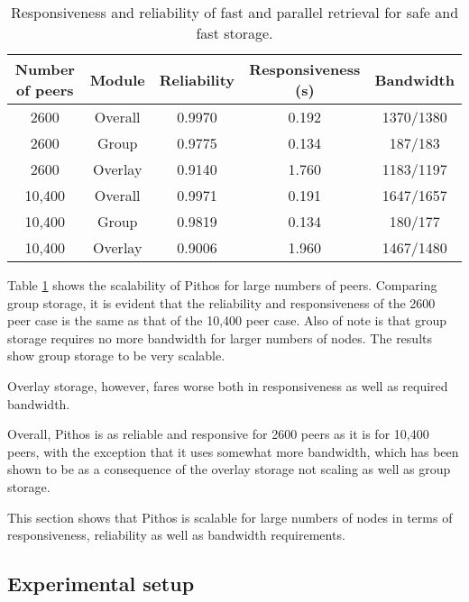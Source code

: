 \begin{table}[htbp]
\centering
\begin{tabular}{|c|c|c|c|c|}
\hline
Number of peers & Module & Reliability & Responsiveness (s)  & Bandwidth \\
\hline
2600            & Overall&  0.9970     &   0.192             & 1370/1380 \\
2600            & Group  &  0.9775     &   0.134             & 187/183   \\
2600            & Overlay&  0.9140     &   1.760             & 1183/1197 \\
10,400          & Overall&  0.9971     &   0.191             & 1647/1657 \\
10,400          & Group  &  0.9819     &   0.134             & 180/177   \\
10,400          & Overlay&  0.9006     &   1.960             & 1467/1480 \\
\hline
\end{tabular}
\caption{Responsiveness and reliability of fast and parallel retrieval for safe and fast storage.}
\label{tab_pithos_scalability_results}
\end{table}
%
Table \ref{tab_pithos_scalability_results} shows the scalability of Pithos for large numbers of peers. Comparing group storage, it is evident that the reliability and responsiveness of the 2600 peer case is the same as that of the 10,400 peer case. Also of note is that group storage requires no more bandwidth for larger numbers of nodes. The results show group storage to be very scalable.

Overlay storage, however, fares worse both in responsiveness as well as required bandwidth.

Overall, Pithos is as reliable and responsive for 2600 peers as it is for 10,400 peers, with the exception that it uses somewhat more bandwidth, which has been shown to be as a consequence of the overlay storage not scaling as well as group storage.

This section shows that Pithos is scalable for large numbers of nodes in terms of responsiveness, reliability as well as bandwidth requirements.

\subsection{Experimental setup}

